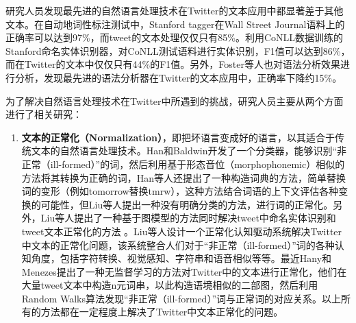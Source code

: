 研究人员发现最先进的自然语言处理技术在Twitter的文本应用中都显著差于其他文本。在自动地词性标注测试中，Stanford tagger在Wall Street Journal语料上的正确率可以达到97\%，而tweet的文本处理仅仅只有85\%。利用CoNLL数据训练的Stanford命名实体识别器，对CoNLL测试语料进行实体识别，F1值可以达到86\%，而在Twitter的文本中仅仅只有44\%的F1值。另外，Foster等人也对语法分析效果进行分析，发现最先进的语法分析器在Twitter的文本应用中，正确率下降约15\%。

为了解决自然语言处理技术在Twitter中所遇到的挑战，研究人员主要从两个方面进行了相关研究：
\begin{enumerate}
\item \textbf{文本的正常化（Normalization）}，即把坏语言变成好的语言，以其适合于传统文本的自然语言处理技术。Han和Baldwin开发了一个分类器，能够识别“非正常（ill-formed）”的词，然后利用基于形态音位（morphophonemic）相似的方法将其转换为正确的词，Han等人还提出了一种构造词典的方法，简单替换词的变形（例如tomorrow替换tmrw），这种方法结合词语的上下文评估各种变换的可能性，但Liu等人提出一种没有明确分类的方法，进行词的正常化。另外，Liu等人提出了一种基于图模型的方法同时解决tweet中命名实体识别和tweet文本正常化的方法 。Liu等人设计一个正常化认知驱动系统解决Twitter中文本的正常化问题，该系统整合人们对于“非正常（ill-formed）”词的各种认知角度，包括字符转换、视觉感知、字符串和语音相似等等。最近Hany和Menezes提出了一种无监督学习的方法对Twitter中的文本进行正常化，他们在大量tweet文本中构造n元词串，以此构造语境相似的二部图，然后利用Random Walks算法发现“非正常（ill-formed）”词与正常词的对应关系。以上所有的方法都在一定程度上解决了Twitter中文本正常化的问题。


\end{enumerate}

